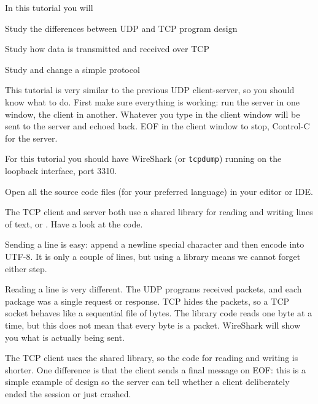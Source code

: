 









In this tutorial you will

\DOT Study the differences between UDP and TCP program design

\DOT Study how data is transmitted and received over TCP

\DOT Study and change a simple protocol


This tutorial is very similar to the previous UDP client-server, so you should
know what to do. First make sure everything is
working: run the server in one window, the client in another. Whatever
you type in the client window will be sent to the server and echoed back. EOF
in the client window to stop, Control-C for the server.

For this tutorial you should have WireShark (or \texttt{tcpdump}) running
on the loopback interface, port 3310.



Open all the source code files (for your preferred language) in your editor
or IDE.

The TCP client and server both use a shared library for reading and writing
lines of text,  or . Have a look at the
code.

Sending a line is easy: append a newline special character and then encode
into UTF-8. It is only a couple of lines, but using a library means we cannot
forget either step.

Reading a line is very different. The UDP programs received packets, and each
package was a single request or response. TCP hides the packets, so a TCP
socket behaves like a sequential file of bytes. The library code reads one
byte at a time, but this does not mean that every byte is a packet. WireShark
will show you what is actually being sent.

The TCP client uses the shared library, so the code for reading and writing
is shorter. One difference is that the client sends a final message on EOF:
this is a simple example of  design so the server can tell
whether a client deliberately ended the session or just crashed.

